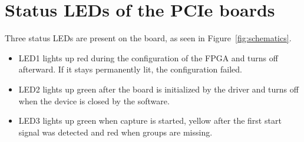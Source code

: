 \ifxHPTDC{}
{
    \section{Status LEDs of the PCIe boards}
    Three status LEDs are present on the board, as seen in 
    Figure~\ref{fig:schematics}.
    \begin{itemize}
        \item LED1 lights up red during the configuration of the FPGA
            and turns off afterward. If it stays permanently lit, the
            configuration failed.
        \item LED2 lights up green after the board is initialized by the
            driver and turns off when the device is closed by the
            software.
        \item LED3 lights up green when capture is started, yellow after
            the first start signal was detected and red when groups are
            missing.
    \end{itemize}
}

